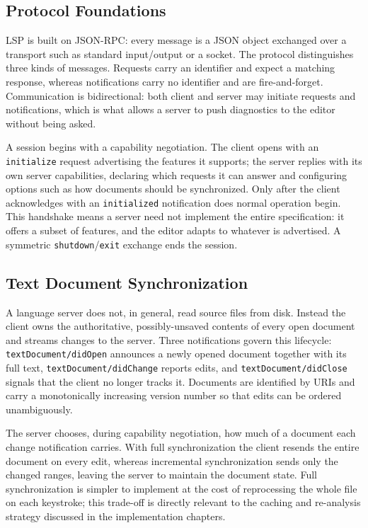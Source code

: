 \subsection{Protocol Foundations}
\label{subsec:lsp-foundations}

LSP is built on JSON-RPC: every message is a JSON object exchanged over a transport such as standard input/output or a socket. 
The protocol distinguishes three kinds of messages. 
Requests carry an identifier and expect a matching response, whereas notifications carry no identifier and are fire-and-forget. 
Communication is bidirectional: both client and server may initiate requests and notifications, which is what allows a server to push diagnostics to the editor without being asked.

A session begins with a capability negotiation. 
The client opens with an \texttt{initialize} request advertising the features it supports; the server replies with its own server capabilities, declaring which requests it can answer and configuring options such as how documents should be synchronized. 
Only after the client acknowledges with an \texttt{initialized} notification does normal operation begin. 
This handshake means a server need not implement the entire specification: it offers a subset of features, and the editor adapts to whatever is advertised. 
A symmetric \texttt{shutdown}/\texttt{exit} exchange ends the session.

\subsection{Text Document Synchronization}
\label{subsec:lsp-sync}

A language server does not, in general, read source files from disk. 
Instead the client owns the authoritative, possibly-unsaved contents of every open document and streams changes to the server. 
Three notifications govern this lifecycle: \texttt{textDocument/didOpen} announces a newly opened document together with its full text, \texttt{textDocument/didChange} reports edits, and \texttt{textDocument/didClose} signals that the client no longer tracks it. 
Documents are identified by URIs and carry a monotonically increasing version number so that edits can be ordered unambiguously.

The server chooses, during capability negotiation, how much of a document each change notification carries. 
With full synchronization the client resends the entire document on every edit, whereas incremental synchronization sends only the changed ranges, leaving the server to maintain the document state. 
Full synchronization is simpler to implement at the cost of reprocessing the whole file on each keystroke; this trade-off is directly relevant to the caching and re-analysis strategy discussed in the implementation chapters.


